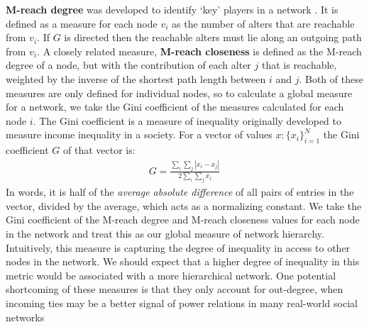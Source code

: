 \documentclass[3p,times]{elsarticle}
\begin{document}
\textbf{M-reach degree} was developed to identify `key' players in a network \cite{key}.  It is defined as a measure for each node $v_{i}$ as the number of alters that are reachable from $v_{i}.$ If $G$ is directed then the reachable alters must lie along an outgoing path from $v_{i}$. A closely related measure, \textbf{M-reach closeness} is defined as the M-reach degree of a node, but with the contribution of each alter $j$ that is reachable, weighted by the inverse of the shortest path length between $i$ and $j$. Both of these measures are only defined for individual nodes, so to calculate a global measure for a network, we take the Gini coefficient of the measures calculated for each node $i$. The Gini  coefficient \cite{Yitzhaki1979} is a measure of inequality originally developed to measure income inequality in a society. For a vector of values $x : \{x_i\}_{i=1}^{N}$ the Gini coefficient $G$ of that vector is:
\begin{align}
	G = \frac{\displaystyle{\sum_i \sum_j \left| x_i - x_j \right|}}{\displaystyle{2 \sum_i \sum_j x_i}}
\end{align}
In words, it is half of the \emph{average absolute difference} of all pairs of entries in the vector, divided by the average, which acts as a normalizing constant. We take the Gini coefficient of the M-reach degree and M-reach closeness values for each node in the network and treat this as our global measure of network hierarchy. Intuitively, this measure is capturing the degree of inequality in access to other nodes in the network. We should expect that a higher degree of inequality in this metric would be associated with a more hierarchical network. One potential shortcoming of these measures is that they only account for out-degree, when incoming ties may be a better signal of power relations in many real-world social networks
\end{document}
